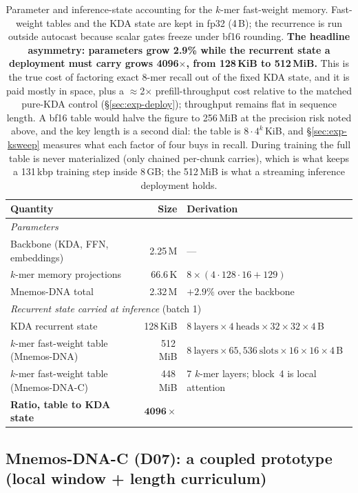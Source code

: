 \documentclass[11pt]{article}
\theoremstyle{plain}
\begin{document}
\begin{table}[!tbp]
\centering\small
\begin{tabular}{lrl}
\toprule
Quantity & Size & Derivation \\
\midrule
\multicolumn{3}{l}{\emph{Parameters}} \\
Backbone (KDA, FFN, embeddings) & 2.25\,M & --- \\
$k$-mer memory projections & 66.6\,K & $8 \times (4{\cdot}128{\cdot}16 + 129)$ \\
Mnemos-DNA total & 2.32\,M & $+2.9\%$ over the backbone \\
\midrule
\multicolumn{3}{l}{\emph{Recurrent state carried at inference} (batch 1)} \\
KDA recurrent state & 128\,KiB & $8\ \text{layers}\times4\ \text{heads}\times32{\times}32\times4$\,B \\
$k$-mer fast-weight table (Mnemos-DNA) & 512\,MiB & $8\ \text{layers}\times65{,}536\ \text{slots}\times16{\times}16\times4$\,B \\
$k$-mer fast-weight table (Mnemos-DNA-C) & 448\,MiB & 7 $k$-mer layers; block~4 is local attention \\
\textbf{Ratio, table to KDA state} & $\mathbf{4096\times}$ & \\
\bottomrule
\end{tabular}
\caption{Parameter and inference-state accounting for the $k$-mer fast-weight memory. Fast-weight
tables and the KDA state are kept in fp32 (4\,B); the recurrence is run outside autocast because
scalar gates freeze under bf16 rounding. \textbf{The headline asymmetry: parameters grow 2.9\%
while the recurrent state a deployment must carry grows 4096$\times$, from 128\,KiB to 512\,MiB.}
This is the true cost of factoring exact 8-mer recall out of the fixed KDA state, and it is
paid mostly in space, plus a $\approx$2$\times$ prefill-throughput cost relative to the matched
pure-KDA control (\S\ref{sec:exp-deploy}); throughput remains flat in sequence length. A bf16 table
would halve the figure to 256\,MiB at the precision risk noted above, and the key length is a
second dial: the table is $8\cdot4^k$\,KiB, and \S\ref{sec:exp-ksweep} measures what each
factor of four buys in recall. During training the full
table is never materialized (only chained per-chunk carries), which is what keeps a 131\,kbp
training step inside 8\,GB; the 512\,MiB is what a streaming inference deployment holds.}
\label{tab:footprint}
\end{table}

\subsection{Mnemos-DNA-C (D07): a coupled prototype (local window + length curriculum)}\label{sec:method-d07}
\end{document}
